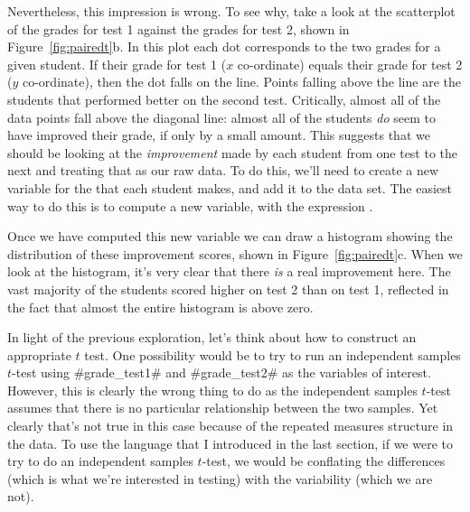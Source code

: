 Nevertheless, this impression is wrong. To see why, take a look at the scatterplot of the grades for test 1 against the grades for test 2,  shown in Figure~\ref{fig:pairedt}b. In this plot each dot corresponds to the two grades for a given student. If their grade for test 1 ($x$ co-ordinate) equals their grade for test 2 ($y$ co-ordinate), then the dot falls on the line. Points falling above the line are the students that performed better on the second test. Critically, almost all of the data points fall above the diagonal line: almost all of the students {\it do} seem to have improved their grade, if only by a small amount. This suggests that we should be looking at the {\it improvement} made by each student from one test to the next and treating that as our raw data. To do this, we'll need to create a new variable for the  that each student makes, and add it to the  data set. The easiest way to do this is to compute a new variable, with the expression .

Once we have computed this new  variable we can draw a histogram showing the distribution of these improvement scores, shown in Figure~\ref{fig:pairedt}c. When we look at the  histogram, it's very clear that there {\it is} a real improvement here. The vast majority of the students scored higher on test 2 than on test 1, reflected in the fact that almost the entire histogram is above zero. 


In light of the previous exploration, let's think about how to construct an appropriate $t$ test. One possibility would be to try to run an independent samples $t$-test using \rtextverb#grade\_test1# and \rtextverb#grade\_test2# as the variables of interest. However, this is clearly the wrong thing to do as the independent samples $t$-test assumes that there is no particular relationship between the two samples. Yet clearly that's not true in this case because of the repeated measures structure in the data. To use the language that I introduced in the last section, if we were to try to do an independent samples $t$-test, we would be conflating the  differences (which is what we're interested in testing) with the  variability (which we are not). 


